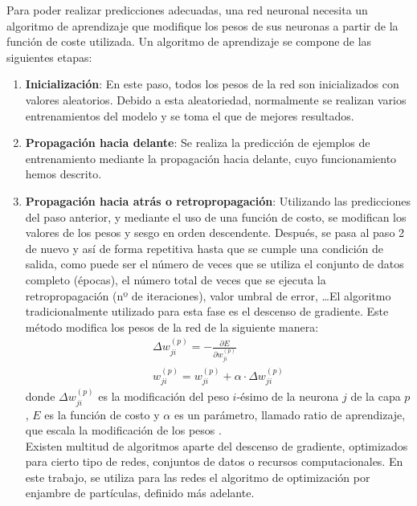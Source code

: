 Para poder realizar predicciones adecuadas, una red neuronal necesita un algoritmo de aprendizaje que modifique los
pesos de sus neuronas a partir de la función de coste utilizada. Un algoritmo de aprendizaje se compone de las 
siguientes etapas:
\begin{enumerate}
    \item \textbf{Inicialización}: En este paso, todos los pesos de la red son inicializados con valores aleatorios.
    Debido a esta aleatoriedad, normalmente se realizan varios entrenamientos del modelo y se toma el que de mejores
    resultados.
    \item \textbf{Propagación hacia delante}: Se realiza la predicción de ejemplos de entrenamiento mediante la
    propagación hacia delante, cuyo funcionamiento hemos descrito.
    \item \textbf{Propagación hacia atrás o retropropagación}: Utilizando las predicciones del paso anterior, y 
    mediante el uso de una función de costo, se modifican los valores de los pesos y sesgo en orden descendente. Después, se pasa al paso 2 de nuevo y así de forma repetitiva hasta que se cumple una condición de salida, como 
    puede ser el número de veces que se utiliza el conjunto de datos completo (épocas), el número total de veces que se ejecuta la retropropagación (nº de iteraciones), valor umbral de error, \dots El algoritmo tradicionalmente 
    utilizado para esta fase es el descenso de gradiente. Este método modifica los pesos de la red de la siguiente 
    manera:
    \begin{gather}
        \Delta w^{(p)}_{ji}=-\frac{\partial E}{\partial w^{(p)}_{ji}} \\
        w^{(p)}_{ji}=w^{(p)}_{ji}+\alpha\cdot\Delta w^{(p)}_{ji}
    \end{gather}
    donde $\Delta w^{(p)}_{ji}$ es la modificación del peso $i$-ésimo de la neurona $j$ de la capa $p$, $E$ es la
    función de costo y $\alpha$ es un parámetro, llamado ratio de aprendizaje, que escala la modificación de los
    pesos \cite{Yagawa2021}.\\
    Existen multitud de algoritmos aparte del descenso de gradiente, optimizados para cierto tipo de redes, conjuntos
    de datos o recursos computacionales. En este trabajo, se utiliza para las redes el algoritmo de optimización por
    enjambre de partículas, definido más adelante.
\end{enumerate}

